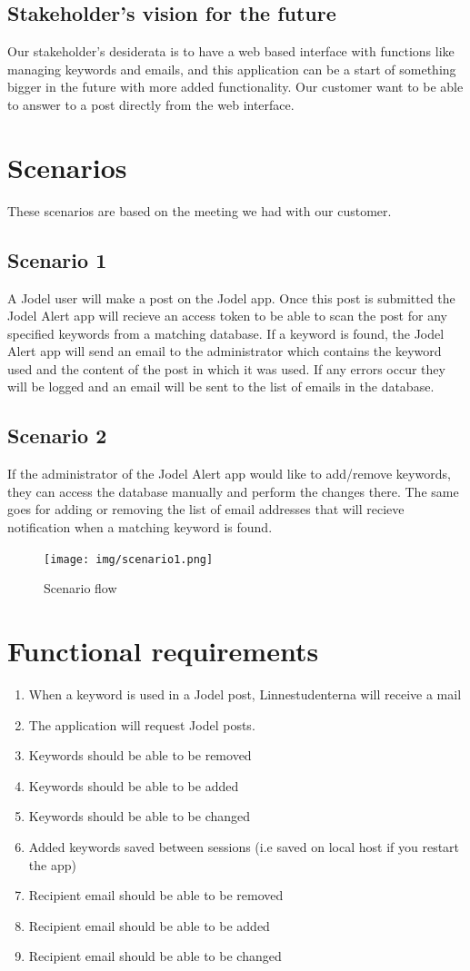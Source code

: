 \documentclass[a4paper,12pt]{article}
\begin{document}
\subsection{Stakeholder's vision for the future}
Our stakeholder's desiderata is to have a web based interface with functions like managing keywords and emails, and this application can be a start of something bigger in the future with more added functionality.
Our customer want to be able to answer to a post directly from the web interface.
\section{Scenarios}
These scenarios are based on the meeting we had with our customer.
\subsection{Scenario 1}
A Jodel user will make a post on the Jodel app. Once this post is submitted the Jodel Alert app will recieve an access token to be able to scan the post for any specified keywords from a matching database. If a keyword is found, the Jodel Alert app will send an email to the administrator which contains the keyword used and the content of the post in which it was used. If any errors occur they will be logged and an email will be sent to the list of emails in the database.
\subsection{Scenario 2}
If the administrator of the Jodel Alert app would like to add/remove keywords, they can access the database manually and perform the changes there. The same goes for adding or removing the list of email addresses that will recieve notification when a matching keyword is found.
\begin{figure}[!h]
	\centering
	\texttt{[image: img/scenario1.png]}
	\caption{Scenario flow}
\end{figure}
\section{Functional requirements}
\begin{enumerate}
	\item When a keyword is used in a Jodel post, Linnestudenterna will receive a mail
	\item The application will request Jodel posts.
	\item Keywords should be able to be removed
	\item Keywords should be able to be added
	\item Keywords should be able to be changed
	\item Added keywords saved between sessions (i.e saved on local host if you restart the app)
	\item Recipient email should be able to be removed
	\item Recipient email should be able to be added
	\item Recipient email should be able to be changed
\end{enumerate}
\end{document}
